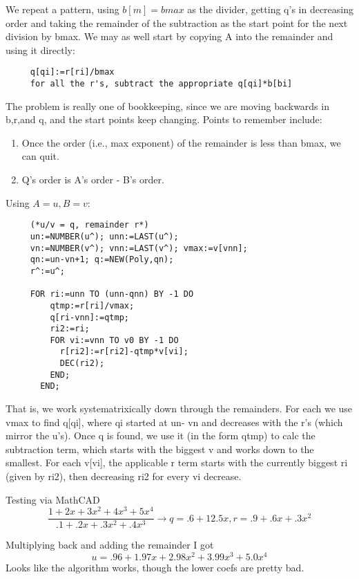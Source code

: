 We repeat a pattern, using $b[m]=bmax$ as the divider, getting
q's in decreasing order and taking the remainder of the
subtraction as the start point for the next division by
bmax.  We may as well start by copying A into the remainder
and using it directly:
\begin{verbatim}
     q[qi]:=r[ri]/bmax
     for all the r's, subtract the appropriate q[qi]*b[bi]
\end{verbatim}

The problem is really one of bookkeeping, since we are
moving backwards in b,r,and q, and the start points keep
changing.  Points to remember include:
\begin{enumerate}
     \item Once the order (i.e., max exponent) of the remainder
       is less than bmax, we can quit.
     \item Q's order is A's order - B's order.
\end{enumerate}
     
Using $A=u, B=v$:
\begin{tt} \begin{verbatim}
     (*u/v = q, remainder r*)
     un:=NUMBER(u^); unn:=LAST(u^);
     vn:=NUMBER(v^); vnn:=LAST(v^); vmax:=v[vnn];
     qn:=un-vn+1; q:=NEW(Poly,qn);
     r^:=u^;
     
     FOR ri:=unn TO (unn-qnn) BY -1 DO
         qtmp:=r[ri]/vmax;
         q[ri-vnn]:=qtmp;
         ri2:=ri;
         FOR vi:=vnn TO v0 BY -1 DO
           r[ri2]:=r[ri2]-qtmp*v[vi];
           DEC(ri2);
         END;
       END;
\end{verbatim} \end{tt}

That is, we work systematrixically down through the remainders.
For each we use vmax to find q[qi], where qi started at un-
vn and decreases with the r's (which mirror the u's).  Once
q is found, we use it (in the form qtmp) to calc the
subtraction term, which starts with the biggest v and works
down to the smallest.  For each v[vi], the applicable r term
starts with the currently biggest ri (given by ri2), then
decreasing ri2 for every vi decrease.

Testing via MathCAD
\begin{equation}
   \frac{1+2x+3x^2+4x^3+5x^4}{.1+.2x+.3x^2+.4x^3} 
     \rightarrow q=.6+12.5x, r=.9+.6x+.3x^2
\end{equation}
    
Multiplying back and adding the remainder I got
\begin{equation}
     u= .96+1.97x+2.98x^2+3.99x^3+5.0x^4
\end{equation}
Looks like the algorithm works, though the lower coefs are
pretty bad.

